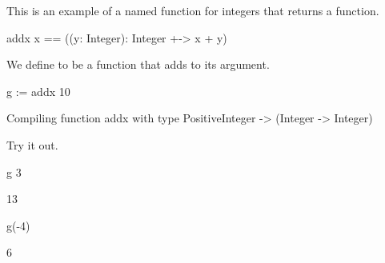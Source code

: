 \begin{xtc}
\begin{xtccomment}
This is an example of a named function for integers that returns a
function.
\end{xtccomment}
\begin{spadsrc}
addx x == ((y: Integer): Integer +-> x + y) 
\end{spadsrc}
\end{xtc}
\begin{xtc}
\begin{xtccomment}
We define  to be a function that adds  to its
argument.
\end{xtccomment}
\begin{spadsrc}
g := addx 10 
\end{spadsrc}
\begin{MessageOutput}
   Compiling function addx with type PositiveInteger -> (Integer -> 
      Integer) 
\end{MessageOutput}
\begin{TeXOutput}
\begin{fricasmath}{6}
%
\end{fricasmath}
\end{TeXOutput}
\end{xtc}
\begin{xtc}
\begin{xtccomment}
Try it out.
\end{xtccomment}
\begin{spadsrc}
g 3 
\end{spadsrc}
\begin{TeXOutput}
\begin{fricasmath}{7}
13%
\end{fricasmath}
\end{TeXOutput}
\end{xtc}
\begin{xtc}
\begin{xtccomment}
\end{xtccomment}
\begin{spadsrc}
g(-4) 
\end{spadsrc}
\begin{TeXOutput}
\begin{fricasmath}{8}
6%
\end{fricasmath}
\end{TeXOutput}
\end{xtc}

